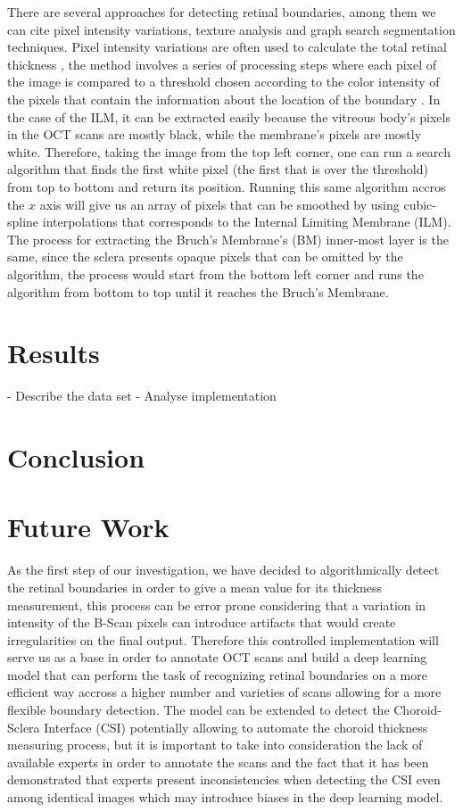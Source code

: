 \documentclass[12pt,a4paper]{scrartcl}
\begin{document}
There are several approaches for detecting retinal boundaries, among them we can cite pixel intensity variations, texture analysis and graph search segmentation techniques. Pixel intensity variations are often used to calculate the total retinal thickness \cite{Alonso-Caneiro2013}, the method involves a series of processing steps where each pixel of the image is compared to a threshold chosen according to the color intensity of the pixels that contain the information about the location of the boundary \cite{Fabritius:09}. In the case of the ILM, it can be extracted easily because the vitreous body's pixels in the OCT scans are mostly black, while the membrane's pixels are mostly white. Therefore, taking the image from the top left corner, one can run a search algorithm that finds the first white pixel (the first that is over the threshold) from top to bottom and return its position. Running this same algorithm accros the $x$ axis will give us an array of pixels that can be smoothed by using cubic-spline interpolations that corresponds to the Internal Limiting Membrane (ILM). The process for extracting the Bruch's Membrane's (BM) inner-most layer is the same, since the sclera presents opaque pixels that can be omitted by the algorithm, the process would start from the bottom left corner and runs the algorithm from bottom to top until it reaches the Bruch's Membrane.      
\section{Results}
- Describe the data set
- Analyse implementation
\section{Conclusion}
\section{Future Work}
As the first step of our investigation, we have decided to algorithmically detect the retinal boundaries in order to give a mean value for its thickness measurement, this process can be error prone considering that a variation in intensity of the B-Scan pixels can introduce artifacts that would create irregularities on the final output. Therefore this controlled implementation will serve us as a base in order to annotate OCT scans and build a deep learning model that can perform the task of recognizing retinal boundaries on a more efficient way accross a higher number and varieties of scans allowing for a more flexible boundary detection. The model can be extended to detect the Choroid-Sclera Interface (CSI) potentially allowing to automate the choroid thickness measuring process, but it is important to take into consideration the lack of available experts in order to annotate the scans and the fact that it has been demonstrated that experts present inconsistencies when detecting the CSI even among identical images \cite{Ronchetti2019statistic} which may introduce biases in the deep learning model.  
\end{document}
